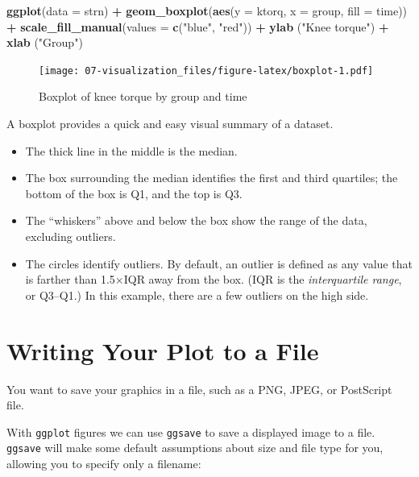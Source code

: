 \documentclass[
]{book}
\newenvironment{Shaded}{\begin{snugshade}}{\end{snugshade}}
\newcommand{\DataTypeTok}[1]{\textcolor[rgb]{0.13,0.29,0.53}{#1}}
\newcommand{\KeywordTok}[1]{\textcolor[rgb]{0.13,0.29,0.53}{\textbf{#1}}}
\newcommand{\NormalTok}[1]{#1}
\newcommand{\OperatorTok}[1]{\textcolor[rgb]{0.81,0.36,0.00}{\textbf{#1}}}
\newcommand{\StringTok}[1]{\textcolor[rgb]{0.31,0.60,0.02}{#1}}
\begin{document}
\begin{Shaded}
\begin{Highlighting}[]
\KeywordTok{ggplot}\NormalTok{(}\DataTypeTok{data =}\NormalTok{ strn) }\OperatorTok{+}
\StringTok{  }\KeywordTok{geom_boxplot}\NormalTok{(}\KeywordTok{aes}\NormalTok{(}\DataTypeTok{y =}\NormalTok{ ktorq, }\DataTypeTok{x =}\NormalTok{ group, }\DataTypeTok{fill =}\NormalTok{ time)) }\OperatorTok{+}
\StringTok{  }\KeywordTok{scale_fill_manual}\NormalTok{(}\DataTypeTok{values =} \KeywordTok{c}\NormalTok{(}\StringTok{"blue"}\NormalTok{, }\StringTok{"red"}\NormalTok{)) }\OperatorTok{+}
\StringTok{  }\KeywordTok{ylab}\NormalTok{ (}\StringTok{"Knee torque"}\NormalTok{) }\OperatorTok{+}
\StringTok{  }\KeywordTok{xlab}\NormalTok{ (}\StringTok{"Group"}\NormalTok{)}
\end{Highlighting}
\end{Shaded}

\begin{figure}
\centering
\texttt{[image: 07-visualization\_files/figure-latex/boxplot-1.pdf]}
\caption{\label{fig:boxplot}Boxplot of knee torque by group and time}
\end{figure}

A boxplot provides a quick and easy visual summary of a dataset.

\begin{itemize}
\item
  The thick line in the middle is the median.
\item
  The box surrounding the median identifies the first and third
  quartiles; the bottom of the box is Q1, and the top is Q3.
\item
  The ``whiskers'' above and below the box show the range of the data,
  excluding outliers.
\item
  The circles identify outliers. By default, an outlier is defined as
  any value that is farther than 1.5×IQR away from the box. (IQR is
  the \emph{interquartile range}, or Q3--Q1.) In this example, there are
  a few outliers on the high side.
\end{itemize}

\hypertarget{recipe-id188}{%
\section{Writing Your Plot to a File}\label{recipe-id188}}

You want to save your graphics in a file, such as a PNG, JPEG, or
PostScript file.

With \texttt{ggplot} figures we can use \texttt{ggsave} to save a displayed image to a file. \texttt{ggsave} will make some default assumptions about size and file type for you, allowing you to specify only a filename:
\end{document}
